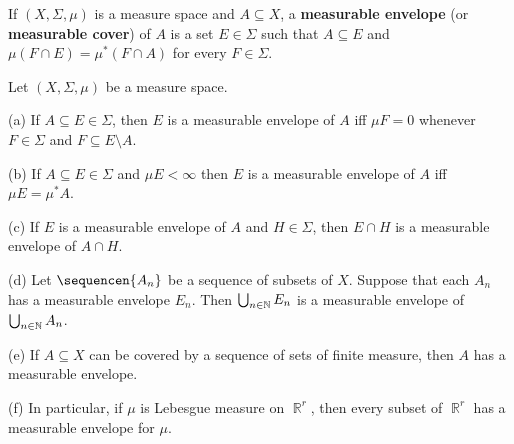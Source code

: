    If $(X,\Sigma,\mu)$ is a measure space and
$A\subseteq X$, a {\bf measurable envelope} (or {\bf measurable
cover}) of $A$ is a set $E\in\Sigma$ such
that $A\subseteq E$ and $\mu(F\cap E)=\mu^*(F\cap A)$ for every
$F\in\Sigma$.   

 Let $(X,\Sigma,\mu)$ be a measure space.

(a) If $A\subseteq E\in\Sigma$, then $E$ is a measurable envelope of
$A$ iff $\mu F=0$ whenever $F\in\Sigma$ and $F\subseteq E\setminus A$.

(b) If $A\subseteq E\in\Sigma$ and $\mu E<\infty$ then $E$ is a
measurable envelope of $A$ iff $\mu E=\mu^*A$.

(c) If $E$ is a measurable envelope of $A$ and $H\in\Sigma$,
then $E\cap H$ is a measurable envelope of $A\cap H$.

(d) Let $\sequencen{A_n}$ be a sequence of subsets of $X$.   Suppose
that each $A_n$ has a measurable envelope $E_n$.   Then
$\bigcup_{n\in\Bbb N}E_n$ is
a measurable envelope of $\bigcup_{n\in\Bbb N}A_n$.

(e) If $A\subseteq X$ can be covered by a sequence of sets of finite
measure, then $A$ has a measurable envelope.

(f) In particular, if $\mu$ is Lebesgue measure on $\BbbR^r$, then
every subset of $\BbbR^r$ has a measurable envelope for $\mu$.


